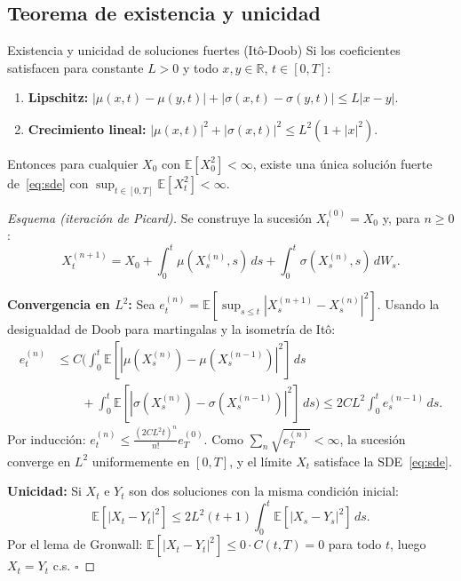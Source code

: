 \subsection{Teorema de existencia y unicidad}
\label{subsec:existencia}

\begin{teorema}{Existencia y unicidad de soluciones fuertes (Itô-Doob)}
\label{thm:ito_doob}
Si los coeficientes satisfacen para constante $L > 0$ y todo $x, y \in \mathbb{R}$,
$t \in [0,T]$:
\begin{enumerate}
  \item \textbf{Lipschitz:}
        $|\mu(x,t)-\mu(y,t)| + |\sigma(x,t)-\sigma(y,t)| \leq L|x-y|$.
  \item \textbf{Crecimiento lineal:}
        $|\mu(x,t)|^2 + |\sigma(x,t)|^2 \leq L^2(1+|x|^2)$.
\end{enumerate}
Entonces para cualquier $X_0$ con $\mathbb{E}[X_0^2] < \infty$, existe una
única solución fuerte de~\eqref{eq:sde} con $\sup_{t\in[0,T]}\mathbb{E}[X_t^2]
< \infty$.
\end{teorema}

\begin{proof}[Esquema (iteración de Picard)]
Se construye la sucesión $X_t^{(0)} = X_0$ y, para $n \geq 0$:
\[
  X_t^{(n+1)} = X_0 + \int_0^t \mu(X_s^{(n)},s)\,ds
  + \int_0^t \sigma(X_s^{(n)},s)\,dW_s.
\]

\noindent\textbf{Convergencia en $L^2$:}
Sea $e_t^{(n)} = \mathbb{E}[\sup_{s \leq t}|X_s^{(n+1)}-X_s^{(n)}|^2]$.
Usando la desigualdad de Doob para martingalas y la isometría de Itô:
\begin{align*}
  e_t^{(n)}
  &\leq C\bigg(\int_0^t \mathbb{E}[|\mu(X_s^{(n)})-\mu(X_s^{(n-1)})|^2]\,ds \\
  &\qquad + \int_0^t \mathbb{E}[|\sigma(X_s^{(n)})-\sigma(X_s^{(n-1)})|^2]\,ds
    \bigg)
  \leq 2CL^2 \int_0^t e_s^{(n-1)}\,ds.
\end{align*}
Por inducción: $e_t^{(n)} \leq \frac{(2CL^2 t)^n}{n!}e_T^{(0)}$.
Como $\sum_n \sqrt{e_T^{(n)}} < \infty$, la sucesión converge en $L^2$
uniformemente en $[0,T]$, y el límite $X_t$ satisface la SDE~\eqref{eq:sde}.

\noindent\textbf{Unicidad:}
Si $X_t$ e $Y_t$ son dos soluciones con la misma condición inicial:
\[
  \mathbb{E}[|X_t-Y_t|^2]
  \leq 2L^2(t+1)\int_0^t \mathbb{E}[|X_s-Y_s|^2]\,ds.
\]
Por el lema de Gronwall: $\mathbb{E}[|X_t-Y_t|^2] \leq 0 \cdot C(t,T) = 0$
para todo $t$, luego $X_t = Y_t$ c.s. $\square$
\end{proof}

